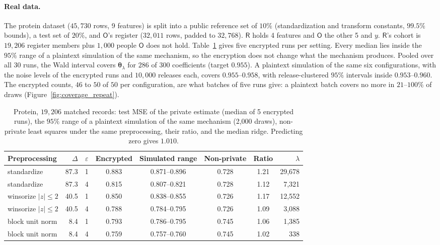\documentclass[11pt]{article}
\theoremstyle{definition}
\theoremstyle{plain}
\newcommand{\btheta}{\boldsymbol{\theta}}
\newcommand{\Party}[1]{\textsf{#1}}
\newcommand{\Rp}{\Party{R}}
\newcommand{\Op}{\Party{O}}
\begin{document}
\paragraph{Real data.} The protein dataset ($45{,}730$ rows, 9 features) is split into a public reference set of $10\%$ (standardization and transform constants, $99.5\%$ bounds), a test set of $20\%$, and $\Op$'s register ($32{,}011$ rows, padded to $32{,}768$). $\Rp$ holds 4 features and $\Op$ the other 5 and $y$. $\Rp$'s cohort is $19{,}206$ register members plus $1{,}000$ people $\Op$ does not hold. Table~\ref{tab:e2e_protein} gives five encrypted runs per setting. Every median lies inside the $95\%$ range of a plaintext simulation of the same mechanism, so the encryption does not change what the mechanism produces. Pooled over all 30 runs, the Wald interval covers $\btheta_\lambda$ for $286$ of $300$ coefficients (target $0.955$). A plaintext simulation of the same six configurations, with the noise levels of the encrypted runs and $10{,}000$ releases each, covers $0.955$--$0.958$, with release-clustered $95\%$ intervals inside $0.953$--$0.960$. The encrypted counts, $46$ to $50$ of $50$ per configuration, are what batches of five runs give: a plaintext batch covers no more in $21$--$100\%$ of draws (Figure~\ref{fig:coverage_repeat}).

\begin{table}[ht]
  \centering\small
  \caption{Protein, $19{,}206$ matched records: test MSE of the private estimate (median of 5 encrypted runs), the $95\%$ range of a plaintext simulation of the same mechanism (2{,}000 draws), non-private least squares under the same preprocessing, their ratio, and the median ridge. Predicting zero gives $1.010$.}
  \label{tab:e2e_protein}
  \begin{tabular}{@{}lrcccccr@{}}
    \toprule
    Preprocessing & $\Delta$ & $\varepsilon$ & Encrypted & Simulated range & Non-private & Ratio & $\lambda$ \\
    \midrule
    standardize & 87.3 & 1 & 0.883 & 0.871--0.896 & 0.728 & 1.21 & 29{,}678 \\
    standardize & 87.3 & 4 & 0.815 & 0.807--0.821 & 0.728 & 1.12 & 7{,}321 \\
    winsorize $|z| \le 2$ & 40.5 & 1 & 0.850 & 0.838--0.855 & 0.726 & 1.17 & 12{,}552 \\
    winsorize $|z| \le 2$ & 40.5 & 4 & 0.788 & 0.784--0.795 & 0.726 & 1.09 & 3{,}088 \\
    block unit norm & 8.4 & 1 & 0.793 & 0.786--0.795 & 0.745 & 1.06 & 1{,}385 \\
    block unit norm & 8.4 & 4 & 0.759 & 0.757--0.760 & 0.745 & 1.02 & 338 \\
    \bottomrule
  \end{tabular}
\end{table}
\end{document}
